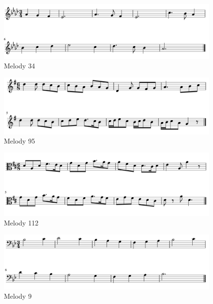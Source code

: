 \documentclass[]{book}
\begin{document}
\begin{figure}

{\centering \includegraphics[width=1\linewidth]{img/Berkowitz34} 

}

\caption{Melody 34}\label{fig:b34}
\end{figure}

\begin{figure}

{\centering \includegraphics[width=1\linewidth]{img/Berkowitz95} 

}

\caption{Melody 95}\label{fig:b95}
\end{figure}

\begin{figure}

{\centering \includegraphics[width=1\linewidth]{img/Berkowitz112} 

}

\caption{Melody 112}\label{fig:b112}
\end{figure}

\begin{figure}

{\centering \includegraphics[width=1\linewidth]{img/BerkowitzNo9} 

}

\caption{Melody 9}\label{fig:b9}
\end{figure}
\end{document}
